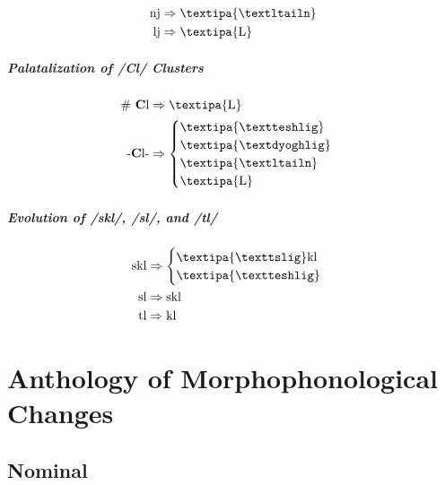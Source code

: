 \documentclass{report}
\begin{document}
\begin{align}
  \text{nj} & \Rightarrow \text{\textipa{\textltailn}} \\
  \text{lj} & \Rightarrow \text{\textipa{L}}
\end{align}

\paragraph{Palatalization of /Cl/ Clusters}

\begin{align}
  \#\ \textbf{C}\text{l} & \Rightarrow \text{\textipa{L}} \\
  \text{-}\textbf{C}\text{l-} & \Rightarrow \begin{cases}
                                              \text{\textipa{\textteshlig}} \\
                                              \text{\textipa{\textdyoghlig}} \\
                                              \text{\textipa{\textltailn}} \\
                                              \text{\textipa{L}}
                                            \end{cases}
\end{align}

\paragraph{Evolution of /skl/, /sl/, and /tl/}

\begin{align}
  \text{skl} & \Rightarrow \begin{cases}
                             \text{\textipa{\texttslig}kl} \\
                             \text{\textipa{\textteshlig}}
                           \end{cases}\\
  \text{sl} & \Rightarrow \text{skl} \\
  \text{tl} & \Rightarrow \text{kl}
\end{align}

\chapter{Anthology of Morphophonological Changes}

\section{Nominal}
\end{document}
